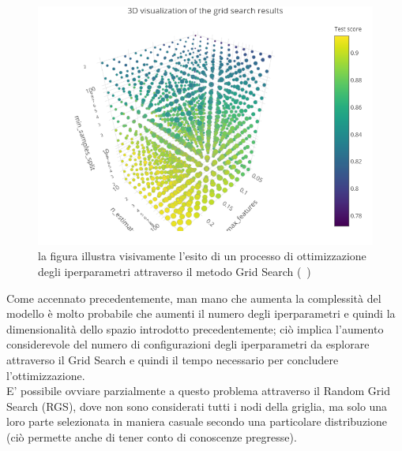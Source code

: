 \begin{figure}[h!]
	\includegraphics[width=\linewidth]{figs/Grid_immagine.png}
	\caption{la figura illustra visivamente l'esito di un processo di ottimizzazione degli iperparametri attraverso il metodo Grid Search (~\cite{knuthwebsite})}
	\label{fig:Grid Search}
\end{figure}
\newpage 

Come accennato precedentemente, man mano che aumenta la complessità del modello è molto probabile che aumenti il numero degli iperparametri e quindi la dimensionalità dello spazio introdotto precedentemente; ciò implica l'aumento considerevole del numero di configurazioni degli iperparametri da esplorare attraverso il Grid Search e quindi il tempo necessario per concludere l'ottimizzazione.\\
E' possibile ovviare parzialmente a questo problema attraverso il Random Grid Search (RGS), dove non sono considerati tutti i nodi della griglia, ma solo una loro parte selezionata in maniera casuale secondo una particolare distribuzione (ciò permette anche di tener conto di conoscenze pregresse). \\

\newpage

